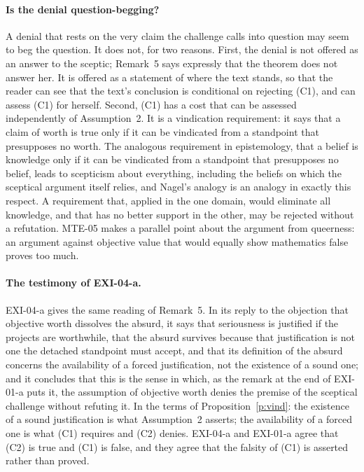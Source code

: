 \paragraph{Is the denial question-begging?} A denial that rests on the very claim the challenge calls into question may seem to beg the question. It does not, for two reasons. First, the denial is not offered as an answer to the sceptic; Remark~5 says expressly that the theorem does not answer her. It is offered as a statement of where the text stands, so that the reader can see that the text's conclusion is conditional on rejecting (C1), and can assess (C1) for herself. Second, (C1) has a cost that can be assessed independently of Assumption~2. It is a vindication requirement: it says that a claim of worth is true only if it can be vindicated from a standpoint that presupposes no worth. The analogous requirement in epistemology, that a belief is knowledge only if it can be vindicated from a standpoint that presupposes no belief, leads to scepticism about everything, including the beliefs on which the sceptical argument itself relies, and Nagel's analogy is an analogy in exactly this respect. A requirement that, applied in the one domain, would eliminate all knowledge, and that has no better support in the other, may be rejected without a refutation. MTE-05 makes a parallel point about the argument from queerness: an argument against objective value that would equally show mathematics false proves too much.

\paragraph{The testimony of EXI-04-a.} EXI-04-a gives the same reading of Remark~5. In its reply to the objection that objective worth dissolves the absurd, it says that seriousness is justified if the projects are worthwhile, that the absurd survives because that justification is not one the detached standpoint must accept, and that its definition of the absurd concerns the availability of a forced justification, not the existence of a sound one; and it concludes that this is the sense in which, as the remark at the end of EXI-01-a puts it, the assumption of objective worth denies the premise of the sceptical challenge without refuting it. In the terms of Proposition~\ref{p:vind}: the existence of a sound justification is what Assumption~2 asserts; the availability of a forced one is what (C1) requires and (C2) denies. EXI-04-a and EXI-01-a agree that (C2) is true and (C1) is false, and they agree that the falsity of (C1) is asserted rather than proved.

